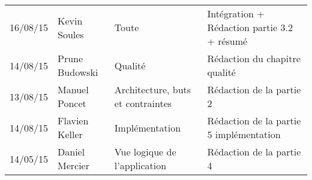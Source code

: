 \small
\begin{tabular}{|p{1.5cm}| >{\raggedright}p{2.9cm}| >{\raggedright}p{3.2cm}|p{7.2cm}|}
  \hline
  \rowcolor{Gainsboro} \color{Navy}{\bfseries Date}  & \color{Navy}{\bfseries Auteur} & \color{Navy}{\bfseries Section(s)}  &\color{Navy}{\bfseries Commentaires} \\
  \hline
  16/08/15 & Kevin Soules &  Toute & Intégration + Rédaction partie 3.2 + résumé\\
  \hline
  14/08/15 & Prune Budowski & Qualité & Rédaction du chapitre qualité\\
  \hline
  13/08/15 & Manuel Poncet &  Architecture, buts et contraintes & Rédaction de la partie 2\\
  \hline
  14/08/15 & Flavien Keller & Implémentation & Rédaction de la partie 5 implémentation \\
  \hline
  14/05/15 & Daniel Mercier & Vue logique de l'application & Rédaction de la partie 4\\
  \hline
\end{tabular}
\normalsize
